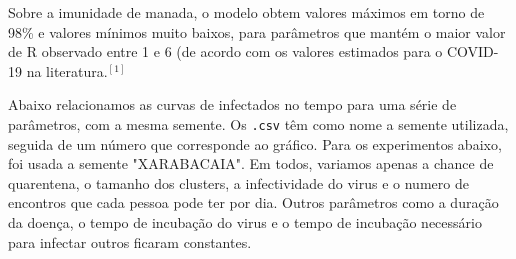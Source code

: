\documentclass[11pt]{article}
\begin{document}
Sobre a imunidade de manada, o modelo obtem valores máximos em torno de 98\% e valores mínimos muito
baixos, para parâmetros que mantém o maior valor de R observado entre 1 e 6 (de acordo com os valores
estimados para o COVID-19 na literatura.\(^{[1]}\)

Abaixo relacionamos as curvas de infectados no tempo para uma série de parâmetros, com a mesma
semente. Os \texttt{.csv} têm como nome a semente utilizada, seguida de um número que corresponde ao gráfico.
Para os experimentos abaixo, foi usada a semente "XARABACAIA". Em todos, variamos apenas a chance de quarentena, o tamanho dos clusters, a infectividade do virus e o numero de encontros que cada pessoa pode ter por dia. Outros parâmetros como a duração da doença, o tempo de incubação do virus e o tempo de incubação necessário para infectar outros ficaram constantes.
\end{document}
